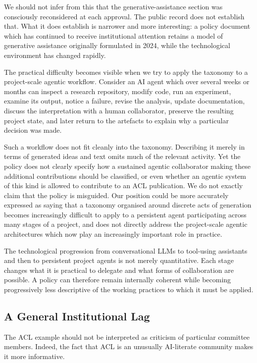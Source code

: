 \documentclass[12pt]{article}
\begin{document}
We should not infer from this that the generative-assistance section was consciously reconsidered at each approval. The public record does not establish that.
What it does establish is narrower and more interesting: a policy document which has continued to receive institutional attention retains a model of generative assistance originally formulated in 2024, while the technological environment has changed rapidly.

The practical difficulty becomes visible when we try to apply the taxonomy to a project-scale agentic workflow. Consider an AI agent which over several weeks or months can inspect a research repository, modify code, run an experiment, examine its output, notice a failure, revise the analysis, update documentation, discuss the interpretation with a human collaborator, preserve the resulting project state, and later return to the artefacts to explain why a particular decision was made.

Such a workflow does not fit cleanly into the taxonomy.
Describing it merely in terms of generated ideas and text omits much of the relevant activity. Yet the policy does not clearly specify how a sustained agentic collaborator making these additional contributions should be classified, or even whether an agentic system of this kind is allowed to contribute to an ACL publication.
We do not exactly claim that the policy is misguided. Our position could be more accurately expressed as saying that a taxonomy organised around discrete acts of generation becomes increasingly difficult to apply to a persistent agent participating across many stages of a project, and 
does not directly address the project-scale agentic architectures which now play an increasingly important role in practice.

The technological progression from conversational LLMs to tool-using assistants and then to persistent project agents is not merely quantitative. Each stage changes what it is practical to delegate and what forms of collaboration are possible.
A policy can therefore remain internally coherent while becoming progressively less descriptive of the working practices to which it must be applied.

\subsection{A General Institutional Lag}

The ACL example should not be interpreted as criticism of particular committee members. Indeed, the fact that ACL is an unusually AI-literate community makes it more informative.
\end{document}
